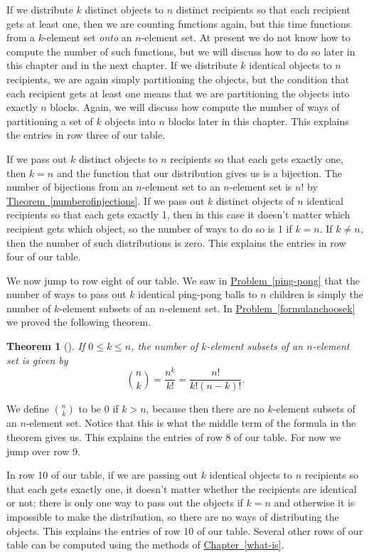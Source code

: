 \documentclass[10pt,]{book}
\theoremstyle{plain}
\newtheorem{theorem}{Theorem}[section]
\theoremstyle{definition}
\theoremstyle{definition}
\numberwithin{equation}{chapter}
\begin{document}
\par
If we distribute \(k\) distinct objects to \(n\) distinct recipients so that each recipient gets at least one, then we are counting functions again, but this time functions from a \(k\)-element set \emph{onto} an \(n\)-element set. At present we do not know how to compute the number of such functions, but we will discuss how to do so later in this chapter and in the next chapter. If we distribute \(k\) identical objects to \(n\) recipients, we are again simply partitioning the objects, but the condition that each recipient gets at least one means that we are partitioning the objects into exactly \(n\) blocks. Again, we will discuss how compute the number of ways of partitioning a set of \(k\) objects into \(n\) blocks later in this chapter. This explains the entries in row three of our table.%
\par
If we pass out \(k\) distinct objects to \(n\) recipients so that each gets exactly one, then \(k=n\) and the function that our distribution gives us is a bijection. The number of bijections from an \(n\)-element set to an \(n\)-element set is \(n!\) by \hyperref[numberofinjections]{Theorem~\ref{numberofinjections}}. If we pass out \(k\) distinct objects of \(n\) identical recipients so that each gets exactly 1, then in this case it doesn't matter which recipient gets which object, so the number of ways to do so is 1 if \(k=n\). If \(k\not=n\), then the number of such distributions is zero. This explains the entries in row four of our table.%
\par
We now jump to row eight of our table. We saw in \hyperref[ping-pong]{Problem~\ref{ping-pong}} that the number of ways to pass out \(k\) identical ping-pong balls to \(n\) children is simply the number of \(k\)-element subsets of an \(n\)-element set. In \hyperref[formulanchoosek]{Problem~\ref{formulanchoosek}} we proved the following theorem.%
\begin{theorem}[{}]\label{theorem-5}
If \(0\le k \le n\), the number of \(k\)-element subsets of an \(n\)-element set is given by%
\begin{equation*}
\binom{n}{k} = \frac{n^{\underline{k}}}{k!}
= \frac{n!}{k!(n-k)!}.
\end{equation*}
%
\end{theorem}
We define \(\binom{n}{k}\) to be 0 if \(k>n\), because then there are no \(k\)-element subsets of an \(n\)-element set. Notice that this is what the middle term of the formula in the theorem gives us. This explains the entries of row 8 of our table. For now we jump over row 9.%
\par
In row 10 of our table, if we are passing out \(k\) identical objects to \(n\) recipients so that each gets exactly one, it doesn't matter whether the recipients are identical or not; there is only one way to pass out the objects if \(k=n\) and otherwise it is impossible to make the distribution, so there are no ways of distributing the objects. This explains the entries of row 10 of our table. Several other rows of our table can be computed using the methods of \hyperref[what-is]{Chapter~\ref{what-is}}.%
\typeout{************************************************}
\typeout{************************************************}
\end{document}
